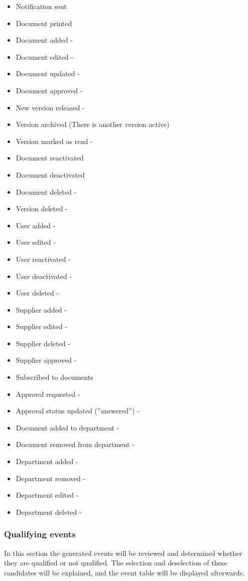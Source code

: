 \begin{itemize}
	\item Notification sent %
	\item Document printed
	\item Document added -
	\item Document edited -
	\item Document updated -
	\item Document approved -
	\item New version released -
	\item Version archived (There is another version active) %
	\item Version marked as read -
	\item Document reactivated %
	\item Document deactivated 
	\item Document deleted -
	\item Version deleted -
	\item User added -
	\item User edited -
	\item User reactivated -
	\item User deactivated -
	\item User deleted -
	\item Supplier added -
	\item Supplier edited -
	\item Supplier deleted -
	\item Supplier approved -
	\item Subscribed to documents %
	\item Approval requested -
	\item Approval status updated (''answered'') -
    \item Document added to department  -
    \item Document removed from department -
    \item Department added -
    \item Department removed - 
    \item Department edited -
    \item Department deleted -
    
\end{itemize}

\subsubsection{Qualifying events}
In this section the generated events will be reviewed and determined whether they are qualified or not qualified.
The selection and deselection of these candidates will be explained, and the event table will be displayed afterwards.





